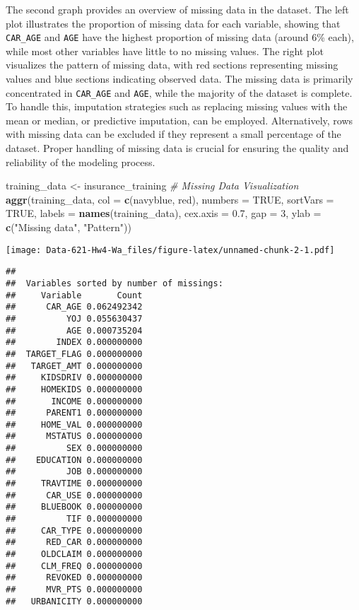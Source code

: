\documentclass[
]{article}
\newenvironment{Shaded}{\begin{snugshade}}{\end{snugshade}}
\newcommand{\AttributeTok}[1]{\textcolor[rgb]{0.13,0.29,0.53}{#1}}
\newcommand{\CommentTok}[1]{\textcolor[rgb]{0.56,0.35,0.01}{\textit{#1}}}
\newcommand{\ConstantTok}[1]{\textcolor[rgb]{0.56,0.35,0.01}{#1}}
\newcommand{\DecValTok}[1]{\textcolor[rgb]{0.00,0.00,0.81}{#1}}
\newcommand{\FloatTok}[1]{\textcolor[rgb]{0.00,0.00,0.81}{#1}}
\newcommand{\FunctionTok}[1]{\textcolor[rgb]{0.13,0.29,0.53}{\textbf{#1}}}
\newcommand{\NormalTok}[1]{#1}
\newcommand{\OtherTok}[1]{\textcolor[rgb]{0.56,0.35,0.01}{#1}}
\newcommand{\StringTok}[1]{\textcolor[rgb]{0.31,0.60,0.02}{#1}}
\begin{document}
The second graph provides an overview of missing data in the dataset.
The left plot illustrates the proportion of missing data for each
variable, showing that \texttt{CAR\_AGE} and \texttt{AGE} have the
highest proportion of missing data (around 6\% each), while most other
variables have little to no missing values. The right plot visualizes
the pattern of missing data, with red sections representing missing
values and blue sections indicating observed data. The missing data is
primarily concentrated in \texttt{CAR\_AGE} and \texttt{AGE}, while the
majority of the dataset is complete. To handle this, imputation
strategies such as replacing missing values with the mean or median, or
predictive imputation, can be employed. Alternatively, rows with missing
data can be excluded if they represent a small percentage of the
dataset. Proper handling of missing data is crucial for ensuring the
quality and reliability of the modeling process.

\begin{Shaded}
\begin{Highlighting}[]
\NormalTok{training\_data }\OtherTok{\textless{}{-}}\NormalTok{ insurance\_training}
\CommentTok{\# Missing Data Visualization}
\FunctionTok{aggr}\NormalTok{(training\_data, }\AttributeTok{col =} \FunctionTok{c}\NormalTok{(}\StringTok{\textquotesingle{}navyblue\textquotesingle{}}\NormalTok{, }\StringTok{\textquotesingle{}red\textquotesingle{}}\NormalTok{), }\AttributeTok{numbers =} \ConstantTok{TRUE}\NormalTok{, }\AttributeTok{sortVars =} \ConstantTok{TRUE}\NormalTok{, }\AttributeTok{labels =} \FunctionTok{names}\NormalTok{(training\_data), }
     \AttributeTok{cex.axis =} \FloatTok{0.7}\NormalTok{, }\AttributeTok{gap =} \DecValTok{3}\NormalTok{, }\AttributeTok{ylab =} \FunctionTok{c}\NormalTok{(}\StringTok{"Missing data"}\NormalTok{, }\StringTok{"Pattern"}\NormalTok{))}
\end{Highlighting}
\end{Shaded}

\texttt{[image: Data-621-Hw4-Wa\_files/figure-latex/unnamed-chunk-2-1.pdf]}

\begin{verbatim}
## 
##  Variables sorted by number of missings: 
##     Variable       Count
##      CAR_AGE 0.062492342
##          YOJ 0.055630437
##          AGE 0.000735204
##        INDEX 0.000000000
##  TARGET_FLAG 0.000000000
##   TARGET_AMT 0.000000000
##     KIDSDRIV 0.000000000
##     HOMEKIDS 0.000000000
##       INCOME 0.000000000
##      PARENT1 0.000000000
##     HOME_VAL 0.000000000
##      MSTATUS 0.000000000
##          SEX 0.000000000
##    EDUCATION 0.000000000
##          JOB 0.000000000
##     TRAVTIME 0.000000000
##      CAR_USE 0.000000000
##     BLUEBOOK 0.000000000
##          TIF 0.000000000
##     CAR_TYPE 0.000000000
##      RED_CAR 0.000000000
##     OLDCLAIM 0.000000000
##     CLM_FREQ 0.000000000
##      REVOKED 0.000000000
##      MVR_PTS 0.000000000
##   URBANICITY 0.000000000
\end{verbatim}
\end{document}

